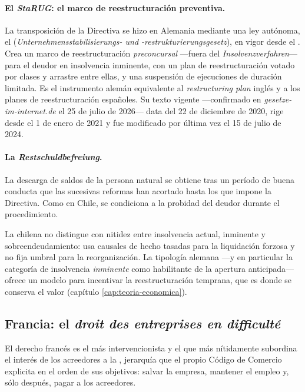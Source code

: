 \paragraph{El \emph{StaRUG}: el marco de reestructuración preventiva.} La transposición de la
Directiva \parencite{ue-directiva-2019-1023} se hizo en Alemania mediante una ley autónoma, el
 (\emph{Unternehmensstabilisierungs- und -restrukturierungsgesetz}), en
vigor desde el . Crea un marco de reestructuración
\emph{preconcursal} ---fuera del \emph{Insolvenzverfahren}--- para el deudor en insolvencia
inminente, con un plan de reestructuración votado por clases y arrastre entre ellas, y una
suspensión de ejecuciones de duración limitada. Es el instrumento alemán equivalente al
\emph{restructuring plan} inglés y a los planes de reestructuración españoles. Su texto vigente ---confirmado en \emph{gesetze-im-internet.de} el 25 de
julio de 2026--- data del 22 de diciembre de 2020, rige desde el 1 de enero de 2021 y fue modificado
por última vez el 15 de julio de 2024.

\paragraph{La \emph{Restschuldbefreiung}.} La descarga de saldos de la persona natural se obtiene
tras un período de buena conducta que las sucesivas reformas han acortado hasta los
 que impone la Directiva. Como en Chile, se condiciona a la probidad del deudor
durante el procedimiento.

\begin{alerta}
La \LIR{} chilena no distingue con nitidez entre insolvencia actual, inminente y sobreendeudamiento:
usa causales de hecho tasadas para la liquidación forzosa y no fija umbral para la reorganización. La
tipología alemana ---y en particular la categoría de insolvencia \emph{inminente} como habilitante
de la apertura anticipada--- ofrece un modelo para incentivar la reestructuración temprana, que es
donde se conserva el valor (capítulo \ref{cap:teoria-economica}).
\end{alerta}

\subsection{Francia: el \emph{droit des entreprises en difficulté}}

El derecho francés es el más intervencionista y el que más nítidamente subordina el interés de los
acreedores a la , jerarquía que el propio Código
de Comercio explicita en el orden de sus objetivos: salvar la empresa, mantener el empleo y, sólo
después, pagar a los acreedores.

